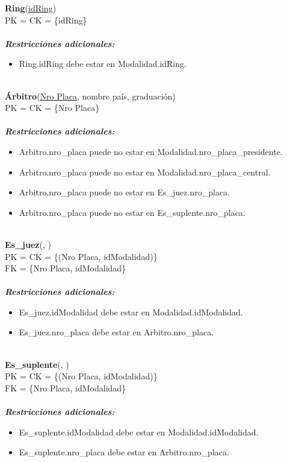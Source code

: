\noindent
\textbf{Ring}(\underline{idRing})\\
PK = CK = \{idRing\}\\\\
\textbf{\textit{Restricciones adicionales:}}
\begin{itemize}
    \item Ring.idRing debe estar en Modalidad.idRing.
\end{itemize}\\

\noindent
\textbf{Árbitro}(\underline{Nro Placa}, nombre país, graduación)\\
PK = CK = \{Nro Placa\}\\\\
\textbf{\textit{Restricciones adicionales:}}
\begin{itemize}
    \item Arbitro.nro\_placa puede no estar en Modalidad.nro\_placa\_presidente.
    \item Arbitro.nro\_placa puede no estar en Modalidad.nro\_placa\_central.
    \item Arbitro.nro\_placa puede no estar en Es\_juez.nro\_placa.
    \item Arbitro.nro\_placa puede no estar en Es\_suplente.nro\_placa.
\end{itemize}\\

\noindent
\textbf{Es\_juez}(, )\\
PK = CK = \{(Nro Placa, idModalidad)\}\\
FK = \{Nro Placa, idModalidad\}\\\\
\textbf{\textit{Restricciones adicionales:}}
\begin{itemize}
    \item Es\_juez.idModalidad debe estar en Modalidad.idModalidad.
    \item Es\_juez.nro\_placa debe estar en Arbitro.nro\_placa.
\end{itemize}\\

\noindent
\textbf{Es\_suplente}(, )\\
PK = CK = \{(Nro Placa, idModalidad)\}\\
FK = \{Nro Placa, idModalidad\}\\\\
\textbf{\textit{Restricciones adicionales:}}
\begin{itemize}
    \item Es\_suplente.idModalidad debe estar en Modalidad.idModalidad.
    \item Es\_suplente.nro\_placa debe estar en Arbitro.nro\_placa.
\end{itemize}\\

